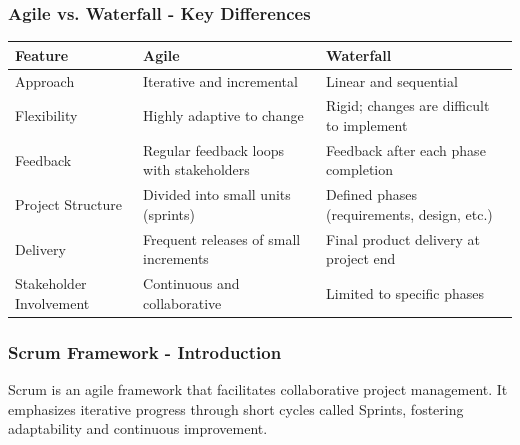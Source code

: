 \documentclass{beamer}
\begin{document}
\begin{frame}[fragile]
    \frametitle{Agile vs. Waterfall - Key Differences}
    \begin{table}[ht]
        \centering
        \begin{tabular}{|l|l|l|}
            \hline
            \textbf{Feature} & \textbf{Agile} & \textbf{Waterfall} \\
            \hline
            Approach & Iterative and incremental & Linear and sequential \\
            \hline
            Flexibility & Highly adaptive to change & Rigid; changes are difficult to implement \\
            \hline
            Feedback & Regular feedback loops with stakeholders & Feedback after each phase completion \\
            \hline
            Project Structure & Divided into small units (sprints) & Defined phases (requirements, design, etc.) \\
            \hline
            Delivery & Frequent releases of small increments & Final product delivery at project end \\
            \hline
            Stakeholder Involvement & Continuous and collaborative & Limited to specific phases \\
            \hline
        \end{tabular}
    \end{table}
\end{frame}

\begin{frame}[fragile]
    \frametitle{Scrum Framework - Introduction}
    Scrum is an agile framework that facilitates collaborative project management. 
    It emphasizes iterative progress through short cycles called Sprints, fostering adaptability and continuous improvement.
\end{frame}
\end{document}
